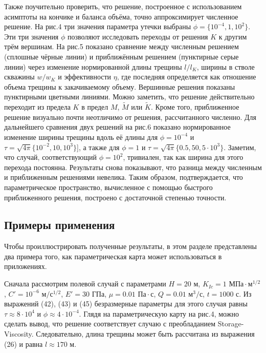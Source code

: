 \documentclass[main.tex]{subfiles}
\begin{document}
Также поучительно проверить, что решение, построенное с использованием асимптоты на кончике и баланса объёма, точно аппроксимирует численное решение.
На рис.4 три значения параметра утечки выбраны $\phi=\{10^{-4},1,10^2\}$.
Эти три значения $\phi$ позволяют исследовать переходы от решения $K$ к другим трём вершинам.
На рис.5 показано сравнение между численным решением (сплошные чёрные линии) и приближённым решением (пунктирные серые линии) через изменение нормированной длины трещины $l/l_K$, ширины в стволе скважины $w/w_K$ и эффективности $\eta$, где последняя определяется как отношение объема трещины к закачиваемому объему.
Вершинные решения показаны пунктирными цветными линиями.
Можно заметить, что решение действительно переходит из предела $K$ в предел $M$, $\tilde{M}$ или $\tilde{K}$.
Кроме того, приближенное решение визуально почти неотличимо от решения, рассчитанного численно.
Для дальнейшего сравнения двух решений на рис.6 показано нормированное изменение ширины трещины вдоль её длины для $\phi=10^{-4}$ и $\tau=\sqrt{4\pi}\{10^{-2},10,10^3\}$], а также для $\phi=1$ и $\tau=\sqrt{4\pi}\{0.5,50,5\cdot10^3\}$.
Заметим, что случай, соответствующий $\phi=10^2$, тривиален, так как ширина для этого перехода постоянна.
Результаты снова показывают, что разница между численным и приближенным решениями невелика.
Таким образом, подтверждается, что параметрическое пространство, вычисленное с помощью быстрого приближенного решения, построено с достаточной степенью точности.

\subsection{Примеры применения}

Чтобы проиллюстрировать полученные результаты, в этом разделе представлены два примера того, как параметрическая карта может использоваться в приложениях.

Сначала рассмотрим полевой случай с параметрами $H=20\text{ м}$, $K_{Ic}=1\text{ МПа}\cdot\text{м}^{1/2}$, $C'=10^{-6}\text{ м}/\text{с}^{1/2}$, $E'=30\text{ ГПа}$, $\mu=0.01\text{ Па}\cdot\text{с}$, $Q=0.01\text{ м}^3/\text{с}$, $t=1000\text{ с}$.
Из выражений (42), (43) и (45) безразмерные параметры для этого случая равны $\tau\approx8\cdot10^4$ и $\phi\approx4\cdot10^{-4}$.
Глядя на параметрическую карту на рис.4, можно сделать вывод, что решение соответствует случаю с преобладанием Storage-Viscosity.
Следовательно, длина трещины может быть рассчитана из выражения (26) и равна $l\approx170\text{ м}$.
\end{document}
